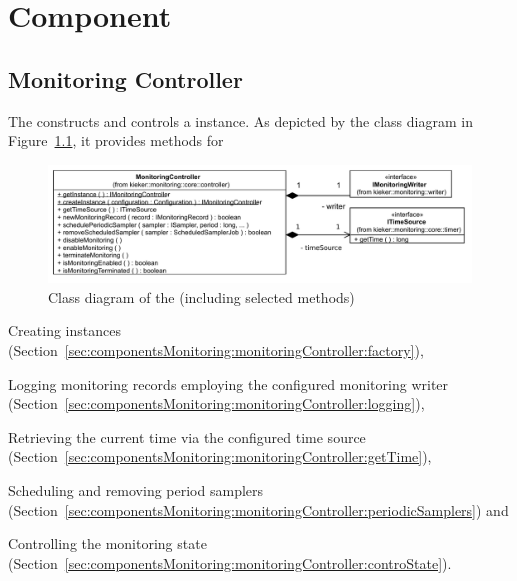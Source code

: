 % 


\chapter{\KiekerMonitoringPart{} Component}\label{chap:componentsMonitoring}


\section{Monitoring Controller}\label{sec:componentsMonitoring:monitoringController}

The  constructs and controls a \KiekerMonitoringPart{} %
instance. As depicted by the class diagram in Figure~\ref{fig:monitoringController:classdiagram}, it provides methods for\\

\begin{figure}\centering %
\includegraphics[scale=0.7]{images/kieker_monitoringControlleruserguide-simplified}
\caption{Class diagram of the  (including selected methods)}
\label{fig:monitoringController:classdiagram}
\end{figure}

\begin{compactitem}
 \item Creating  instances (Section~\ref{sec:componentsMonitoring:monitoringController:factory}),
 \item Logging monitoring records employing the configured monitoring writer (Section~\ref{sec:componentsMonitoring:monitoringController:logging}), 
 \item Retrieving the current time via the configured time source (Section~\ref{sec:componentsMonitoring:monitoringController:getTime}),
 \item Scheduling and removing period samplers (Section~\ref{sec:componentsMonitoring:monitoringController:periodicSamplers}) and
 \item Controlling the monitoring state (Section~\ref{sec:componentsMonitoring:monitoringController:controState}).
\end{compactitem}

